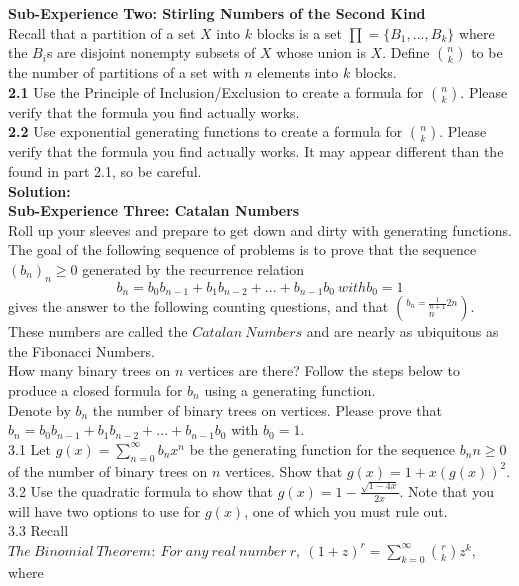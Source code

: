 \documentclass[10pt,a4paper]{report}
\begin{document}
	
	\textbf{Sub-Experience Two: Stirling Numbers of the Second Kind}\\
	Recall that a partition of a set $X$ into $k$ blocks is a set $\prod = \{B_1,...,B_k\}$ where the $B_i$s are disjoint nonempty subsets of $X$ whose union is $X$. Define ${n}\choose{k}$ to be the number of partitions of a set with $n$ elements into $k$ blocks.\\
	\textbf{2.1} Use the Principle of Inclusion/Exclusion to create a formula for ${n}\choose{k}$.  Please verify that the formula you find actually works.\\
	\textbf{2.2} Use exponential generating functions to create a formula for ${n}\choose{k}$.  Please verify that the formula you find actually works.  It may appear different than the found in part 2.1, so be careful.\\
	\textbf{Solution: }\\
	\newline
	\textbf{Sub-Experience Three: Catalan Numbers}\\
	Roll up your sleeves and prepare to get down and dirty with generating functions.  The goal of the following sequence of problems is to prove that the sequence $(b_n)_n\geq0$ generated by the recurrence relation\\
	\[b_n = b_0b_{n-1} + b_1b_{n-2} + ... + b_{n-1}b_0\ with b_0 = 1\]
	gives the answer to the following counting questions, and that $b_n = \frac{1}{n+1}{2n}\choose{n}$.  These numbers are called the $Catalan\ Numbers$ and are nearly as ubiquitous as the Fibonacci Numbers.\\
	\newline
	How many binary trees on $n$ vertices are there?  Follow the steps below to produce a closed formula for $b_n$ using a generating function.\\
	 Denote by $b_n$ the number of binary trees on vertices.  Please prove that $b_n = b_0b_{n-1} + b_1b_{n-2} + ... + b_{n-1}b_0$ with $b_0 = 1$.\\
	3.1 Let $g(x) = \sum_{n=0}^{\infty}b_nx^n$ be the generating function for the sequence $b_n n\geq0$ of the number of binary trees on $n$ vertices.  Show that $g(x) = 1+x(g(x))^2$.\\
	3.2 Use the quadratic formula to show that $g(x) = 1-\frac{\sqrt{1-4x}}{2x}$. Note that you will have two options to use for $g(x)$, one of which you must rule out.\\
	3.3 Recall $The\ Binomial\ Theorem:\ For\ any\ real\ number\ r,\ (1+z)^r = \sum_{k=0}^{\infty}\binom{r}{k}z^k$, where 
\end{document}
